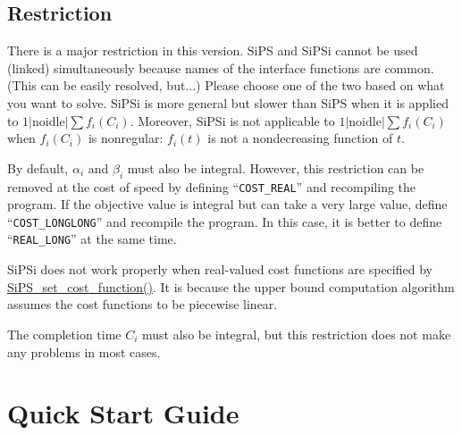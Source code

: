 \documentclass[a4paper]{book}
\begin{document}
\section{Restriction}

There is a major restriction in this version.
SiPS and SiPSi cannot be used (linked) simultaneously because names of the interface functions are common.
(This can be easily resolved, but...)
Please choose one of the two based on what you want to solve.
SiPSi is more general but slower than SiPS when it is applied to $1|\mathrm{noidle}|\sum f_i(C_i)$.
Moreover, SiPSi is not applicable to $1|\mathrm{noidle}|\sum f_i(C_i)$ when $f_i(C_i)$ is nonregular: $f_i(t)$ is not a nondecreasing function of $t$.

By default, $\alpha_i$ and $\beta_i$ must also be integral.
However, this restriction can be removed at the cost of speed by defining ``\verb+COST_REAL+'' and recompiling the program.
If the objective value is integral but can take a very large value, define ``\verb+COST_LONGLONG+'' and recompile the program.
In this case, it is better to define ``\verb+REAL_LONG+'' at the same time.

SiPSi does not work properly when real-valued cost functions are specified by
\hyperlink{SiPS_set_cost_function}{SiPS\_set\_cost\_function()}.
It is because the upper bound computation algorithm assumes the cost functions to be piecewise linear.

The completion time $C_i$ must also be integral, but this restriction does not make any problems in most cases.

\chapter{Quick Start Guide}
\end{document}
